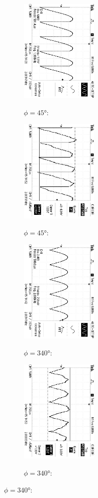 \begin{figure}
\begin{subfigure}{0.48\textwidth}
\centering
\caption{$\phi=45°$:}
\includegraphics[angle=90,height=5cm]{graphics/ALL0037/F0037TEK.jpg}
\label{fig:phi45o}
\end{subfigure}
\begin{subfigure}{0.48\textwidth}
\centering
\caption{$\phi=45°$:}
\includegraphics[angle=90,height=5cm]{graphics/ALL0045/F0045TEK.jpg}
\label{fig:phi45m}
\end{subfigure}

\begin{subfigure}{0.48\textwidth}
\centering
\caption{$\phi=340°$:}
\includegraphics[angle=90,height=5cm]{graphics/ALL0038/F0038TEK.jpg}
\label{fig:phi340o}
\end{subfigure}
\begin{subfigure}{0.48\textwidth}
\centering
\caption{$\phi=340°$:}
\includegraphics[angle=90,height=5cm]{graphics/ALL0046/F0046TEK.jpg}
\label{fig:phi340m}
\end{subfigure}

\label{fig:U_out}
\end{figure}

